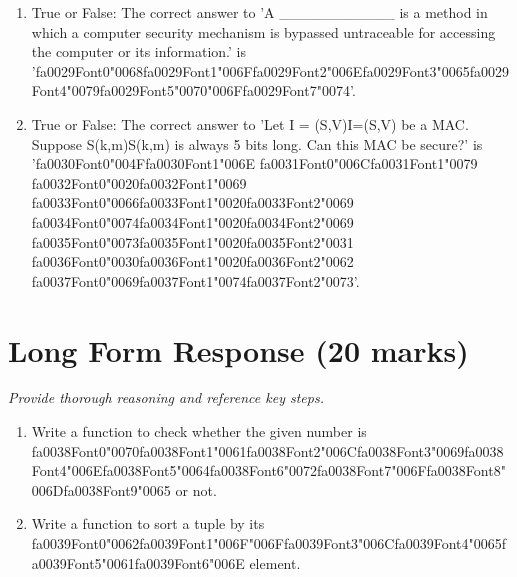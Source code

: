 \documentclass[12pt]{article}
\begin{document}
\begin{enumerate}[label=\arabic*.]
\item True or False: The correct answer to 'A \_\_\_\_\_\_\_\_\_\_\_ is a method in which a computer security mechanism is bypassed untraceable for accessing the computer or its information.' is '{\csname fa0029Font0\endcsname\char"0068}{\csname fa0029Font1\endcsname\char"006F}{\csname fa0029Font2\endcsname\char"006E}{\csname fa0029Font3\endcsname\char"0065}{\csname fa0029Font4\endcsname\char"0079}{\csname fa0029Font5\endcsname\char"0070}{\char"006F}{\csname fa0029Font7\endcsname\char"0074}'.
\item True or False: The correct answer to 'Let I = (S,V)I=(S,V) be a MAC. Suppose S(k,m)S(k,m) is always 5 bits long. Can this MAC be secure?' is '{\csname fa0030Font0\endcsname\char"004F}{\csname fa0030Font1\endcsname\char"006E} {\csname fa0031Font0\endcsname\char"006C}{\csname fa0031Font1\endcsname\char"0079} {\csname fa0032Font0\endcsname\char"0020}{\csname fa0032Font1\endcsname\char"0069} {\csname fa0033Font0\endcsname\char"0066}{\csname fa0033Font1\endcsname\char"0020}{\csname fa0033Font2\endcsname\char"0069} {\csname fa0034Font0\endcsname\char"0074}{\csname fa0034Font1\endcsname\char"0020}{\csname fa0034Font2\endcsname\char"0069} {\csname fa0035Font0\endcsname\char"0073}{\csname fa0035Font1\endcsname\char"0020}{\csname fa0035Font2\endcsname\char"0031} {\csname fa0036Font0\endcsname\char"0030}{\csname fa0036Font1\endcsname\char"0020}{\csname fa0036Font2\endcsname\char"0062} {\csname fa0037Font0\endcsname\char"0069}{\csname fa0037Font1\endcsname\char"0074}{\csname fa0037Font2\endcsname\char"0073}'.
\end{enumerate}

\section*{Long Form Response (20 marks)}
\textit{Provide thorough reasoning and reference key steps.}
\begin{enumerate}[label=\arabic*.]
\item Write a function to check whether the given number is {\csname fa0038Font0\endcsname\char"0070}{\csname fa0038Font1\endcsname\char"0061}{\csname fa0038Font2\endcsname\char"006C}{\csname fa0038Font3\endcsname\char"0069}{\csname fa0038Font4\endcsname\char"006E}{\csname fa0038Font5\endcsname\char"0064}{\csname fa0038Font6\endcsname\char"0072}{\csname fa0038Font7\endcsname\char"006F}{\csname fa0038Font8\endcsname\char"006D}{\csname fa0038Font9\endcsname\char"0065} or not.
\item Write a function to sort a tuple by its {\csname fa0039Font0\endcsname\char"0062}{\csname fa0039Font1\endcsname\char"006F}{\char"006F}{\csname fa0039Font3\endcsname\char"006C}{\csname fa0039Font4\endcsname\char"0065}{\csname fa0039Font5\endcsname\char"0061}{\csname fa0039Font6\endcsname\char"006E} element.
\end{enumerate}
\end{document}
